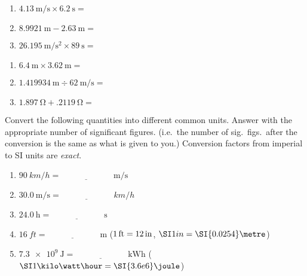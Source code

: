 \documentclass[12pt]{../ossphysics}
\begin{document}
\begin{questions}
  \vspace{.15in}\begin{minipage}{.45\textwidth}
    \begin{enumerate}[itemsep=20pt,label={(\alph*)}]
    \item $\SI{4.13}{\metre\per\second}\times\SI{6.2}\second=$
    \item $\SI{8.9921}\metre-\SI{2.63}\metre=$
    \item $\SI{26.195}{\metre\per\second\squared}\times\SI{89}{\second}=$
    \end{enumerate}
  \end{minipage}
  \begin{minipage}{.45\textwidth}
    \begin{enumerate}[itemsep=20pt,start=4,label={(\alph*)}]
    \item $\SI{6.4}\metre\times\SI{3.62}\metre=$
    \item $\SI{1.419934}\metre\div\SI{62}{\metre\per\second}=$
    \item $\SI{1.897}\ohm+\SI{.2119}\ohm=$
    \end{enumerate}
  \end{minipage}
  \vspace{.15in}
  
  \question Convert the following quantities into different common units.
  Answer with the appropriate number of significant figures. (i.e.\ the number
  of sig.\ figs.\ after the conversion is the same as what is given to
  you.) Conversion factors from imperial to SI units are \emph{exact}.
  \begin{enumerate}[itemsep=20pt,label={(\alph*)}]
  \item $\SI{90}{km/h}=\underline{\hspace{1in}}\;\si{\metre\per\second}$
  \item $\SI{30.0}{\metre\per\second}=\underline{\hspace{1in}}\;\si{km/h}$
  \item $\SI{24.0}\hour=\underline{\hspace{1in}}\;\si\second$
  \item $\SI{16}{ft}=\underline{\hspace{1in}}\;\si\metre$
    ($\SI1{ft}=\SI{12}{in}$, $\SI1{in}=\SI{0.0254}\metre$)
  \item $\SI{7.3e9}\joule=\underline{\hspace{1in}}\;\si{\kilo\watt\hour}$
    ($\SI1{\kilo\watt\hour}=\SI{3.6e6}\joule$)
  \end{enumerate}
  \newpage


\end{questions}
\end{document}
